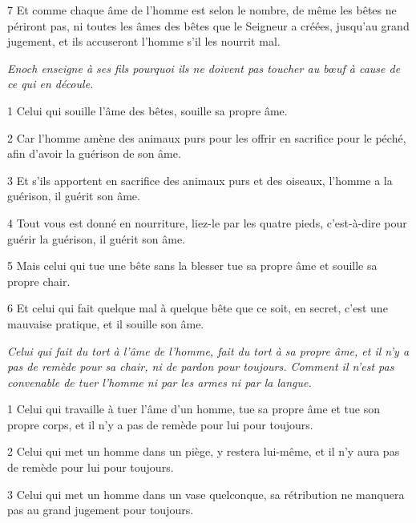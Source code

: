 \par 7 Et comme chaque âme de l'homme est selon le nombre, de même les bêtes ne périront pas, ni toutes les âmes des bêtes que le Seigneur a créées, jusqu'au grand jugement, et ils accuseront l'homme s'il les nourrit mal.


\par \textit{Enoch enseigne à ses fils pourquoi ils ne doivent pas toucher au bœuf à cause de ce qui en découle.}

\par 1 Celui qui souille l'âme des bêtes, souille sa propre âme.

\par 2 Car l'homme amène des animaux purs pour les offrir en sacrifice pour le péché, afin d'avoir la guérison de son âme.

\par 3 Et s'ils apportent en sacrifice des animaux purs et des oiseaux, l'homme a la guérison, il guérit son âme.

\par 4 Tout vous est donné en nourriture, liez-le par les quatre pieds, c'est-à-dire pour guérir la guérison, il guérit son âme.

\par 5 Mais celui qui tue une bête sans la blesser tue sa propre âme et souille sa propre chair.

\par 6 Et celui qui fait quelque mal à quelque bête que ce soit, en secret, c'est une mauvaise pratique, et il souille son âme.


\par \textit{Celui qui fait du tort à l'âme de l'homme, fait du tort à sa propre âme, et il n'y a pas de remède pour sa chair, ni de pardon pour toujours. Comment il n'est pas convenable de tuer l'homme ni par les armes ni par la langue.}

\par 1 Celui qui travaille à tuer l'âme d'un homme, tue sa propre âme et tue son propre corps, et il n'y a pas de remède pour lui pour toujours.

\par 2 Celui qui met un homme dans un piège, y restera lui-même, et il n'y aura pas de remède pour lui pour toujours.

\par 3 Celui qui met un homme dans un vase quelconque, sa rétribution ne manquera pas au grand jugement pour toujours.

